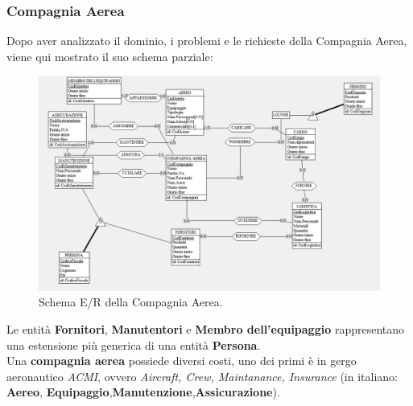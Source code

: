 

\newpage

\subsubsection{Compagnia Aerea}

\textsf{\small Dopo aver analizzato il dominio, i problemi e le richieste della Compagnia Aerea, viene qui mostrato il suo schema parziale:}

\begin{figure}[H] %
	\centering
	\includegraphics[width=1.2\linewidth, height=1.2\textheight, keepaspectratio]{./img/Compagnia_Aerea.png}
	\caption{Schema E/R della Compagnia Aerea.}
	\label{fig:schema_compagnia_aerea}
\end{figure}

\textsf{\small Le entità \textbf{Fornitori}, \textbf{Manutentori} e \textbf{Membro dell'equipaggio} rappresentano una estensione più generica di una entità \textbf{Persona}.  }\\

\textsf{\small Una \textbf{compagnia aerea} possiede diversi costi, uno dei primi è in gergo aeronautico \emph{ACMI}, ovvero \emph{Aircraft, Crew, Maintanance, Insurance} (in italiano: \textbf{Aereo}, \textbf{Equipaggio},\textbf{Manutenzione},\textbf{Assicurazione}).}\\

